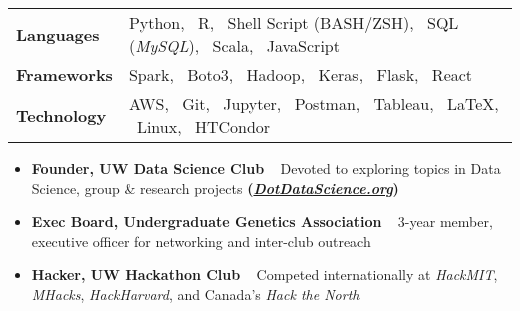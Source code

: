 \documentclass[10pt, letterpaper]{awesome-cv}
\newcommand{\col}{awesome-red}
\newcommand{\regcol}{\textcolor{\col}}
\newcommand{\skill}[2]
{\skilltypestyle{#1} \ \skillsetstyle{#2}}
\newcommand{\award}[2]
{\skilltypestyle{#1} \ifthenelse{\isempty{#2}}{}{\textit{(#2)}}\\}
\renewcommand*{\skilltypestyle}[1]{{\bodyfont\bfseries\color{darktext} #1}}
\renewcommand*{\skillsetstyle}[1]{{\bodyfont\color{text} #1}}
\begin{document}
    \vspace*{2mm}
        \begin{tabular}{@{\hskip 1em} l @{\hskip 1em} l }
        
       \skilltypestyle{\regcol{Languages}} &
        \skillsetstyle{ Python, \ R, \ Shell Script (BASH/ZSH), \ SQL (\textit{MySQL}), \ Scala, \ JavaScript }\\
        \skilltypestyle{\regcol{Frameworks}} &
        \skillsetstyle{ Spark, \ Boto3, \ Hadoop, \ Keras, \ Flask, \ React }\\
        
        \skilltypestyle{\regcol{Technology}} &
        \skillsetstyle{ AWS, \ Git, \ Jupyter, \ Postman, \ Tableau, \ \LaTeX{}, \ Linux, \ HTCondor }\\
            
        \end{tabular}
\vspace*{-2mm}
\vspace*{-3mm}
\begin{itemize}[noitemsep, leftmargin=0em, label={}]
    \item\skill{Founder, UW Data Science Club}{Devoted to exploring topics in Data Science, group \& research projects \textbf{(\href{http://DotDataScience.org}{\textit{DotDataScience.org}})}}
    
    
    \item \skill{Exec Board, Undergraduate Genetics Association}
    {3-year member, executive officer for networking and inter-club outreach}
    
    
    \item \skill{Hacker, UW Hackathon Club}{Competed internationally at \textit{HackMIT}, \textit{MHacks}, \textit{HackHarvard}, and Canada's \textit{Hack the North}}
    
\end{itemize}
\end{document}
